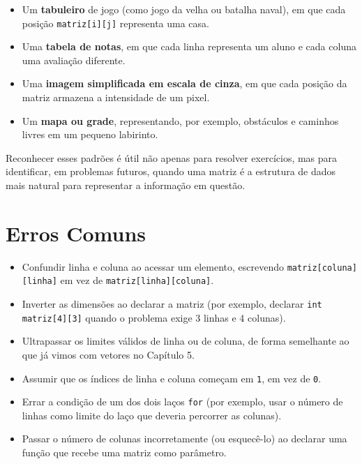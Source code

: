 \begin{itemize}
    \item Um \textbf{tabuleiro} de jogo (como jogo da velha ou batalha naval), em que cada posição \texttt{matriz[i][j]} representa uma casa.
    \item Uma \textbf{tabela de notas}, em que cada linha representa um aluno e cada coluna uma avaliação diferente.
    \item Uma \textbf{imagem simplificada em escala de cinza}, em que cada posição da matriz armazena a intensidade de um pixel.
    \item Um \textbf{mapa ou grade}, representando, por exemplo, obstáculos e caminhos livres em um pequeno labirinto.
\end{itemize}

Reconhecer esses padrões é útil não apenas para resolver exercícios, mas para identificar, em problemas futuros, quando uma matriz é a estrutura de dados mais natural para representar a informação em questão.

\section{Erros Comuns}
\label{sec:matrizes-erros}

\begin{itemize}
    \item Confundir linha e coluna ao acessar um elemento, escrevendo \texttt{matriz[coluna][linha]} em vez de \texttt{matriz[linha][coluna]}.
    \item Inverter as dimensões ao declarar a matriz (por exemplo, declarar \texttt{int matriz[4][3]} quando o problema exige 3 linhas e 4 colunas).
    \item Ultrapassar os limites válidos de linha ou de coluna, de forma semelhante ao que já vimos com vetores no Capítulo 5.
    \item Assumir que os índices de linha e coluna começam em \texttt{1}, em vez de \texttt{0}.
    \item Errar a condição de um dos dois laços \texttt{for} (por exemplo, usar o número de linhas como limite do laço que deveria percorrer as colunas).
    \item Passar o número de colunas incorretamente (ou esquecê-lo) ao declarar uma função que recebe uma matriz como parâmetro.
\end{itemize}

